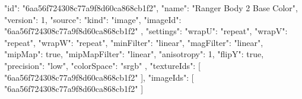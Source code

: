 {
  "id": "6aa56f724308c77a9f8d60ca868cb1f2",
  "name": "Ranger Body 2 Base Color",
  "version": 1,
  "source": {
    "kind": "image",
    "imageId": "6aa56f724308c77a9f8d60ca868cb1f2"
  },
  "settings": {
    "wrapU": "repeat",
    "wrapV": "repeat",
    "wrapW": "repeat",
    "minFilter": "linear",
    "magFilter": "linear",
    "mipMap": true,
    "mipMapFilter": "linear",
    "anisotropy": 1,
    "flipY": true,
    "precision": "low",
    "colorSpace": "srgb"
  },
  "textureIds": [
    "6aa56f724308c77a9f8d60ca868cb1f2"
  ],
  "imageIds": [
    "6aa56f724308c77a9f8d60ca868cb1f2"
  ]
}
